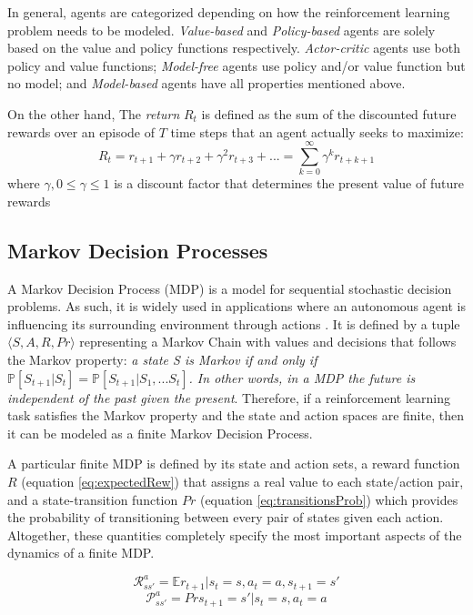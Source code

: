 In general, agents are categorized depending on how the reinforcement learning problem needs to be modeled. \textit{Value-based} and \textit{Policy-based} agents are solely based on the value and policy functions respectively. \textit{Actor-critic} agents use both policy and value functions; \textit{Model-free} agents use policy and/or value function but no model; and \textit{Model-based} agents have all properties mentioned above.

On the other hand, The \textit{return} $R_t$ is defined as the sum of the discounted future rewards over an episode of $T$ time steps that an agent actually seeks to maximize:
\begin{equation}
\label{eq:return}
R_t = r_{t+1} + \gamma r_{t+2} + \gamma^2 r_{t+3} + ... = \sum^{\infty}_{k=0} \gamma^k r_{t+k+1}
\end{equation}
where $\gamma, 0 \leq \gamma \leq 1$ is a discount factor that determines the present value of future rewards

\subsection{Markov Decision Processes}

A Markov Decision Process (MDP) is a model for sequential stochastic decision problems. As such, it is widely used in applications where an autonomous agent is influencing its surrounding environment through actions \cite{shani2005mdp}. It is defined by a tuple $\langle S, A, R, Pr \rangle$ representing a Markov Chain with values and decisions that follows the Markov property: \textit{a state S is Markov if and only if $\mathbb{P}[S_{t+1}|S_t] = \mathbb{P}[S_{t+1}|S_1,...S_t]$. In other words, in a MDP the future is independent of the past given the present}. Therefore, if a reinforcement learning task satisfies the Markov property and the state and action spaces are finite, then it can be modeled as a finite Markov Decision Process.

A particular finite MDP is defined by its state and action sets, a reward function $R$ (equation \ref{eq:expectedRew}) that assigns a real value to each state/action pair, and a state-transition function $Pr$ (equation \ref{eq:transitionsProb}) which provides the probability of transitioning between every pair of states given each action. Altogether, these quantities completely specify the most important aspects of the dynamics of a finite MDP.

\begin{equation}
\label{eq:expectedRew}
\mathcal{R}^a_{ss'} = \mathbb{E} {r_{t+1} | s_t=s, a_t=a, s_{t+1}=s'}
\end{equation}
\begin{equation}
\label{eq:transitionsProb}
\mathcal{P}^a_{ss'} = Pr {s_{t+1} = s' | s_t=s, a_t=a}
\end{equation}

